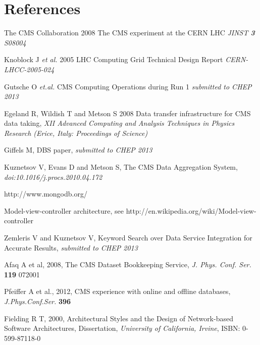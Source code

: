 \section*{References}

\begin{thebibliography}{1}
The CMS Collaboration 2008 The CMS experiment at the CERN LHC {\it JINST {\bf 3} S08004}

Knoblock J {\it et al.} 2005 LHC Computing Grid Technical Design Report {\it CERN-LHCC-2005-024}

 Gutsche O {\it et.al.} CMS Computing Operations during Run 1 {\it submitted to CHEP 2013}

  Egeland R, Wildish T and Metson S 2008 Data transfer infrastructure for CMS data taking,  {\it XII Advanced Computing and Analysis Techniques in Physics Research (Erice, Italy: Proceedings of Science)}

Giffels M, DBS paper, {\it submitted to CHEP 2013}

Kuznetsov V, Evans D and Metson S, The CMS Data Aggregation System,
{\it doi:10.1016/j.procs.2010.04.172}

http://www.mongodb.org/

 Model-view-controller architecture, see
http://en.wikipedia.org/wiki/Model-view-controller

 Zemleris V and Kuznetsov V,
Keyword Search over Data Service Integration for Accurate Results,
{\it submitted to CHEP 2013}

 Afaq A et al, 2008, The CMS Dataset Bookkeeping Service, 
{\it J. Phys. Conf. Ser.} 
{\bf 119} 072001

 Pfeiffer A et al., 2012, CMS experience with online and offline databases, 
{\it J.Phys.Conf.Ser.} 
{\bf 396}

 Fielding R T, 2000, Architectural Styles and the Design of Network-based Software Architectures, Dissertation, 
{\it University of California, Irvine}, 
ISBN: 0-599-87118-0

\end{thebibliography}
